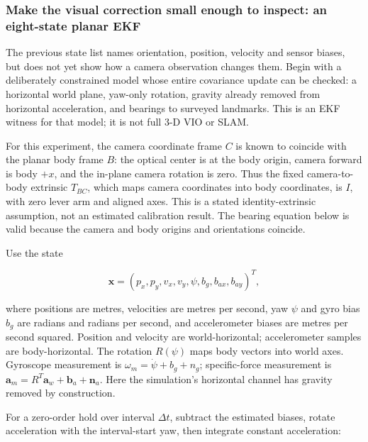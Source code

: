\subsubsection{Make the visual correction small enough to inspect: an eight-state planar EKF}\label{04-visual-computing-ii-ch035-make-the-visual-correction-small-enough-to-inspect-an-eight-state-planar-ekf}

\hypertarget{04-visual-computing-ii-ch035-make-the-visual-correction-small-enough-to-inspect-an-eight-state-planar-ekf}{}

The previous state list names orientation, position, velocity and sensor biases, but does not yet show how a camera observation changes them. Begin with a deliberately constrained model whose entire covariance update can be checked: a horizontal world plane, yaw-only rotation, gravity already removed from horizontal acceleration, and bearings to surveyed landmarks. This is an EKF witness for that model; it is not full 3-D VIO or SLAM.

For this experiment, the camera coordinate frame \(C\) is known to coincide with the planar body frame \(B\): the optical center is at the body origin, camera forward is body \(+x\), and the in-plane camera rotation is zero. Thus the fixed camera-to-body extrinsic \(T_{BC}\), which maps camera coordinates into body coordinates, is \(I\), with zero lever arm and aligned axes. This is a stated identity-extrinsic assumption, not an estimated calibration result. The bearing equation below is valid because the camera and body origins and orientations coincide.

Use the state

\[
\mathbf{x}=(p_x,p_y,v_x,v_y,\psi,b_g,b_{ax},b_{ay})^T,
\]

where positions are metres, velocities are metres per second, yaw \(\psi\) and gyro bias \(b_g\) are radians and radians per second, and accelerometer biases are metres per second squared. Position and velocity are world-horizontal; accelerometer samples are body-horizontal. The rotation \(R(\psi)\) maps body vectors into world axes. Gyroscope measurement is \(\omega_m=\dot\psi+b_g+n_g\); specific-force measurement is \(\mathbf{a}_m=R^T\mathbf{a}_w+\mathbf{b}_a+\mathbf{n}_a\). Here the simulation's horizontal channel has gravity removed by construction.

For a zero-order hold over interval \(\Delta t\), subtract the estimated biases, rotate acceleration with the interval-start yaw, then integrate constant acceleration:

